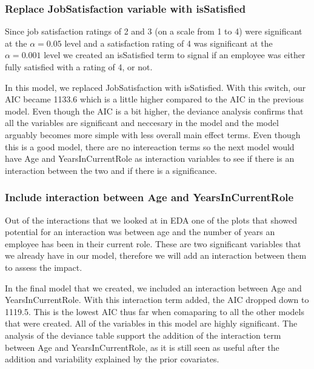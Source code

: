 \documentclass[]{article}
\begin{document}
\hypertarget{replace-jobsatisfaction-variable-with-issatisfied}{%
\subsubsection{Replace JobSatisfaction variable with
isSatisfied}\label{replace-jobsatisfaction-variable-with-issatisfied}}

Since job satisfaction ratings of 2 and 3 (on a scale from 1 to 4) were
significant at the \(\alpha = 0.05\) level and a satisfaction rating of
4 was significant at the \(\alpha = 0.001\) level we created an
isSatisfied term to signal if an employee was either fully satisfied
with a rating of 4, or not.

In this model, we replaced JobSatisfaction with isSatisfied. With this
switch, our AIC became 1133.6 which is a little higher compared to the
AIC in the previous model. Even though the AIC is a bit higher, the
deviance analysis confirms that all the variables are significant and
neccesary in the model and the model arguably becomes more simple with
less overall main effect terms. Even though this is a good model, there
are no intereaction terms so the next model would have Age and
YearsInCurrentRole as interaction variables to see if there is an
interaction between the two and if there is a significance.

\hypertarget{include-interaction-between-age-and-yearsincurrentrole}{%
\subsubsection{Include interaction between Age and
YearsInCurrentRole}\label{include-interaction-between-age-and-yearsincurrentrole}}

Out of the interactions that we looked at in EDA one of the plots that
showed potential for an interaction was between age and the number of
years an employee has been in their current role. These are two
significant variables that we already have in our model, therefore we
will add an interaction between them to assess the impact.

In the final model that we created, we included an interaction between
Age and YearsInCurrentRole. With this interaction term added, the AIC
dropped down to 1119.5. This is the lowest AIC thus far when comaparing
to all the other models that were created. All of the variables in this
model are highly significant. The analysis of the deviance table support
the addition of the interaction term between Age and YearsInCurrentRole,
as it is still seen as useful after the addition and variability
explained by the prior covariates.
\end{document}
